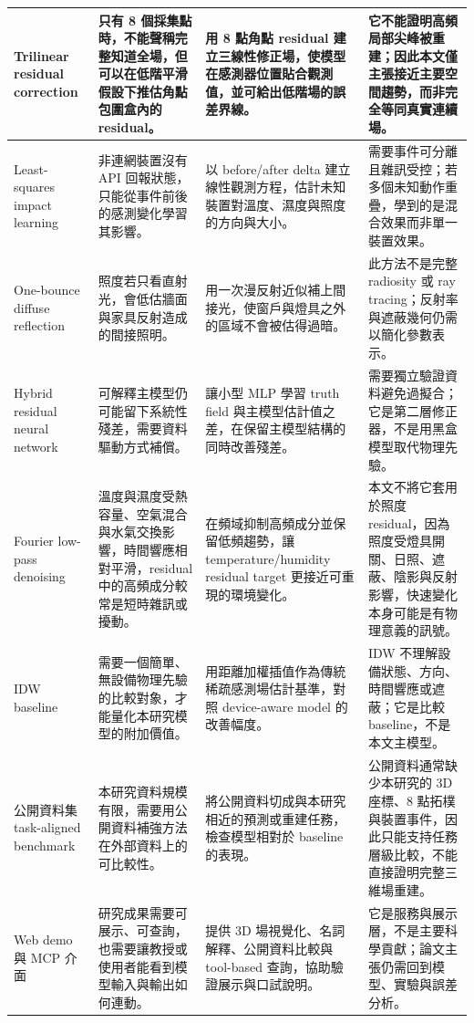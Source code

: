 \documentclass[12pt,a4paper]{article}
\begin{document}
\begin{table}[htbp]
\begin{tabular}{|>{\raggedright\arraybackslash}p{}|>{\raggedright\arraybackslash}p{}|>{\raggedright\arraybackslash}p{}|>{\raggedright\arraybackslash}p{}|}
\hline
Trilinear residual correction & 只有 8 個採集點時，不能聲稱完整知道全場，但可以在低階平滑假設下推估角點包圍盒內的 residual。 & 用 8 點角點 residual 建立三線性修正場，使模型在感測器位置貼合觀測值，並可給出低階場的誤差界線。 & 它不能證明高頻局部尖峰被重建；因此本文僅主張接近主要空間趨勢，而非完全等同真實連續場。 \\
\hline
Least-squares impact learning & 非連網裝置沒有 API 回報狀態，只能從事件前後的感測變化學習其影響。 & 以 before/after delta 建立線性觀測方程，估計未知裝置對溫度、濕度與照度的方向與大小。 & 需要事件可分離且雜訊受控；若多個未知動作重疊，學到的是混合效果而非單一裝置效果。 \\
\hline
One-bounce diffuse reflection & 照度若只看直射光，會低估牆面與家具反射造成的間接照明。 & 用一次漫反射近似補上間接光，使窗戶與燈具之外的區域不會被估得過暗。 & 此方法不是完整 radiosity 或 ray tracing；反射率與遮蔽幾何仍需以簡化參數表示。 \\
\hline
Hybrid residual neural network & 可解釋主模型仍可能留下系統性殘差，需要資料驅動方式補償。 & 讓小型 MLP 學習 truth field 與主模型估計值之差，在保留主模型結構的同時改善殘差。 & 需要獨立驗證資料避免過擬合；它是第二層修正器，不是用黑盒模型取代物理先驗。 \\
\hline
Fourier low-pass denoising & 溫度與濕度受熱容量、空氣混合與水氣交換影響，時間響應相對平滑，residual 中的高頻成分較常是短時雜訊或擾動。 & 在頻域抑制高頻成分並保留低頻趨勢，讓 temperature/humidity residual target 更接近可重現的環境變化。 & 本文不將它套用於照度 residual，因為照度受燈具開關、日照、遮蔽、陰影與反射影響，快速變化本身可能是有物理意義的訊號。 \\
\hline
IDW baseline & 需要一個簡單、無設備物理先驗的比較對象，才能量化本研究模型的附加價值。 & 用距離加權插值作為傳統稀疏感測場估計基準，對照 device-aware model 的改善幅度。 & IDW 不理解設備狀態、方向、時間響應或遮蔽；它是比較 baseline，不是本文主模型。 \\
\hline
公開資料集 task-aligned benchmark & 本研究資料規模有限，需要用公開資料補強方法在外部資料上的可比較性。 & 將公開資料切成與本研究相近的預測或重建任務，檢查模型相對於 baseline 的表現。 & 公開資料通常缺少本研究的 3D 座標、8 點拓樸與裝置事件，因此只能支持任務層級比較，不能直接證明完整三維場重建。 \\
\hline
Web demo 與 MCP 介面 & 研究成果需要可展示、可查詢，也需要讓教授或使用者能看到模型輸入與輸出如何連動。 & 提供 3D 場視覺化、名詞解釋、公開資料比較與 tool-based 查詢，協助驗證展示與口試說明。 & 它是服務與展示層，不是主要科學貢獻；論文主張仍需回到模型、實驗與誤差分析。 \\
\hline
\end{tabular}
\end{table}
\end{document}
